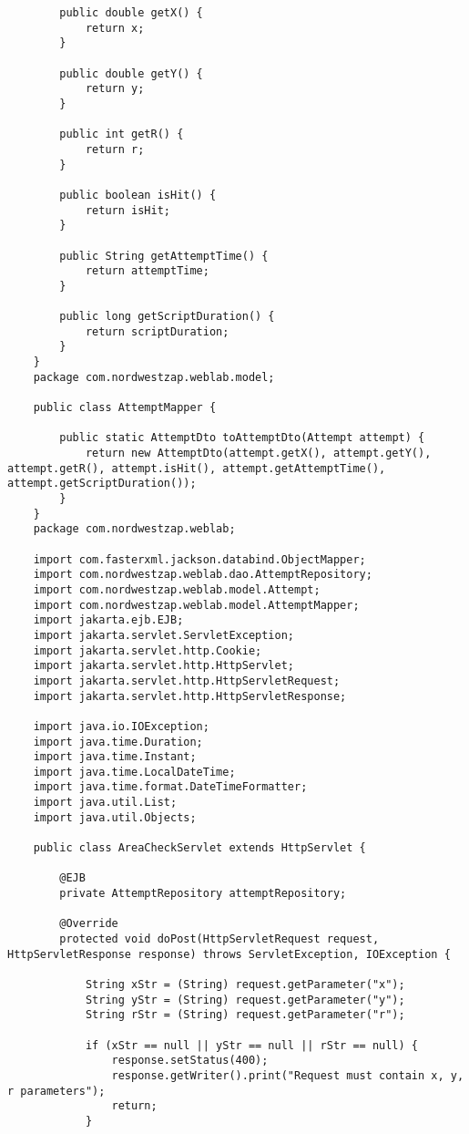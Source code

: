 \documentclass{article}
\begin{document}
\begin{verbatim}
        public double getX() {
            return x;
        }
    
        public double getY() {
            return y;
        }
    
        public int getR() {
            return r;
        }
    
        public boolean isHit() {
            return isHit;
        }
    
        public String getAttemptTime() {
            return attemptTime;
        }
    
        public long getScriptDuration() {
            return scriptDuration;
        }
    }
    package com.nordwestzap.weblab.model;

    public class AttemptMapper {
    
        public static AttemptDto toAttemptDto(Attempt attempt) {
            return new AttemptDto(attempt.getX(), attempt.getY(), attempt.getR(), attempt.isHit(), attempt.getAttemptTime(), attempt.getScriptDuration());
        }
    }
    package com.nordwestzap.weblab;

    import com.fasterxml.jackson.databind.ObjectMapper;
    import com.nordwestzap.weblab.dao.AttemptRepository;
    import com.nordwestzap.weblab.model.Attempt;
    import com.nordwestzap.weblab.model.AttemptMapper;
    import jakarta.ejb.EJB;
    import jakarta.servlet.ServletException;
    import jakarta.servlet.http.Cookie;
    import jakarta.servlet.http.HttpServlet;
    import jakarta.servlet.http.HttpServletRequest;
    import jakarta.servlet.http.HttpServletResponse;
    
    import java.io.IOException;
    import java.time.Duration;
    import java.time.Instant;
    import java.time.LocalDateTime;
    import java.time.format.DateTimeFormatter;
    import java.util.List;
    import java.util.Objects;
    
    public class AreaCheckServlet extends HttpServlet {
    
        @EJB
        private AttemptRepository attemptRepository;
    
        @Override
        protected void doPost(HttpServletRequest request, HttpServletResponse response) throws ServletException, IOException {
    
            String xStr = (String) request.getParameter("x");
            String yStr = (String) request.getParameter("y");
            String rStr = (String) request.getParameter("r");
    
            if (xStr == null || yStr == null || rStr == null) {
                response.setStatus(400);
                response.getWriter().print("Request must contain x, y, r parameters");
                return;
            }
    

\end{verbatim}
\end{document}
